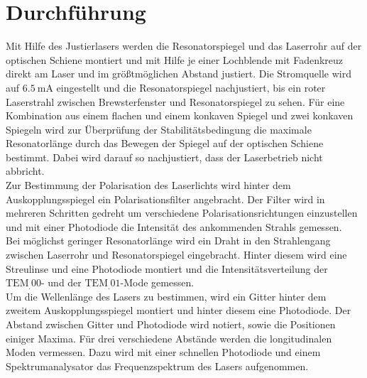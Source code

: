 \section{Durchführung}
\label{sec:Durchführung}

Mit Hilfe des Justierlasers werden die Resonatorspiegel und das Laserrohr auf der optischen Schiene montiert und mit Hilfe je einer Lochblende mit Fadenkreuz direkt am Laser und im größtmöglichen Abstand justiert. Die Stromquelle wird auf $\SI{6.5}{\milli\ampere}$ eingestellt und die Resonatorspiegel nachjustiert, bis ein roter Laserstrahl zwischen Brewsterfenster und Resonatorspiegel zu sehen.
Für eine Kombination aus einem flachen und einem konkaven Spiegel und zwei konkaven Spiegeln wird zur Überprüfung der Stabilitätsbedingung die maximale Resonatorlänge durch das Bewegen der Spiegel auf der optischen Schiene bestimmt. Dabei wird darauf so nachjustiert, dass der Laserbetrieb nicht abbricht.\\
Zur Bestimmung der Polarisation des Laserlichts wird hinter dem Auskopplungsspiegel ein Polarisationsfilter angebracht. Der Filter wird in mehreren Schritten gedreht um verschiedene Polarisationsrichtungen einzustellen und mit einer Photodiode die Intensität des ankommenden Strahls gemessen.\\
Bei möglichst geringer Resonatorlänge wird ein Draht in den Strahlengang zwischen Laserrohr und Resonatorspiegel eingebracht. Hinter diesem wird eine Streulinse und eine Photodiode montiert und die Intensitätsverteilung der $\text{TEM}_.{00}$- und der $\text{TEM}_.{01}$-Mode gemessen.\\
Um die Wellenlänge des Lasers zu bestimmen, wird ein Gitter hinter dem zweitem Auskopplungsspiegel montiert und hinter diesem eine Photodiode. Der Abstand zwischen Gitter und Photodiode wird notiert, sowie die Positionen einiger Maxima.
Für drei verschiedene Abstände werden die longitudinalen Moden vermessen. Dazu wird mit einer schnellen Photodiode und einem Spektrumanalysator das Frequenzspektrum des Lasers aufgenommen.